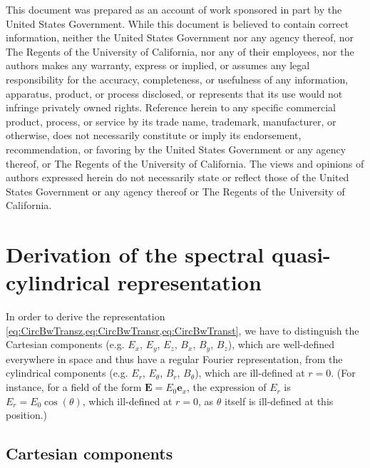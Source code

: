 \documentclass[1p,times]{elsarticle}
\renewcommand{\vec}[1]{\boldsymbol{#1}}
\begin{document}
This document was prepared as an account of work sponsored in part by the United States Government. While this document is believed to contain correct information, neither the United States Government nor any agency thereof, nor The Regents of the University of California, nor any of their employees, nor the authors makes any warranty, express or implied, or assumes any legal responsibility for the accuracy, completeness, or usefulness of any information, apparatus, product, or process disclosed, or represents that its use would not infringe privately owned rights. Reference herein to any specific commercial product, process, or service by its trade name, trademark, manufacturer, or otherwise, does not necessarily constitute or imply its endorsement, recommendation, or favoring by the United States Government or any agency thereof, or The Regents of the University of California. The views and opinions of authors expressed herein do not necessarily state or reflect those of the United States Government or any agency thereof or The Regents of the University of California.

\appendix


\section{Derivation of the spectral quasi-cylindrical representation}
\label{sec:CircTrans}

In order to derive the representation
\cref{eq:CircBwTransz,eq:CircBwTransr,eq:CircBwTranst}, we have to
distinguish the Cartesian components (e.g. $E_x$, $E_y$, $E_z$, $B_x$,
$B_y$, $B_z$), which are well-defined everywhere in space and thus have a regular
Fourier representation, from the cylindrical components (e.g. $E_r$,
$E_\theta$, $B_r$, $B_\theta$), which are ill-defined at $r=0$. (For instance, for a
field of the form $\vec{E} = E_0 \vec{e}_x$, the expression of $E_r$
is $E_r = E_0 \cos(\theta)$, which ill-defined at $r=0$, as $\theta$
itself is ill-defined at this position.)

\subsection{Cartesian components}
\end{document}
